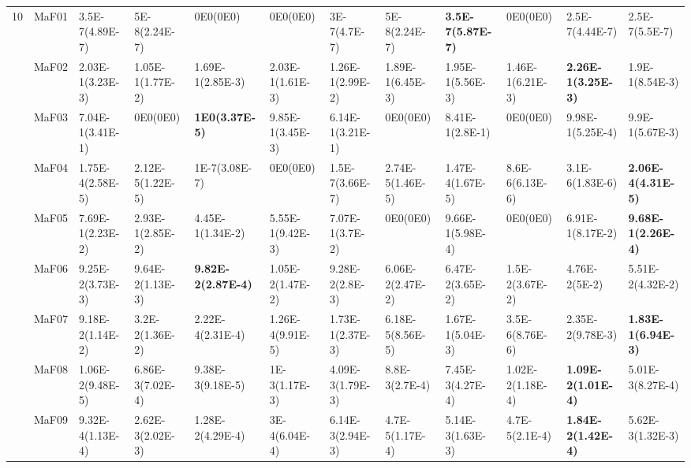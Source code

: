 \documentclass[]{article}
\begin{document}
\begin{landscape}
\begin{table}
\begin{footnotesize}
\begin{tabular}{|l|l|l|l|l|l|l|l|l|l|l|l|}
\multirow{15}{*}{10} & MaF01 & \cellcolor{gray95} 3.5E-7(4.89E-7) & \cellcolor{gray95} 5E-8(2.24E-7) & \cellcolor{gray95} 0E0(0E0) & \cellcolor{gray95} 0E0(0E0) & \cellcolor{gray95} 3E-7(4.7E-7) & \cellcolor{gray95} 5E-8(2.24E-7) & \cellcolor{gray95} {\bf 3.5E-7(5.87E-7)} & \cellcolor{gray95} 0E0(0E0) & \cellcolor{gray95} 2.5E-7(4.44E-7) & \cellcolor{gray95} 2.5E-7(5.5E-7)\\
 & MaF02 & \cellcolor{gray95} 2.03E-1(3.23E-3) & 1.05E-1(1.77E-2) & 1.69E-1(2.85E-3) & \cellcolor{gray95} 2.03E-1(1.61E-3) & 1.26E-1(2.99E-2) & 1.89E-1(6.45E-3) & 1.95E-1(5.56E-3) & 1.46E-1(6.21E-3) & \cellcolor{gray95} {\bf 2.26E-1(3.25E-3)} & 1.9E-1(8.54E-3)\\
 & MaF03 & 7.04E-1(3.41E-1) & 0E0(0E0) & \cellcolor{gray95} {\bf 1E0(3.37E-5)} & 9.85E-1(3.45E-3) & 6.14E-1(3.21E-1) & 0E0(0E0) & 8.41E-1(2.8E-1) & 0E0(0E0) & \cellcolor{gray95} 9.98E-1(5.25E-4) & \cellcolor{gray95} 9.9E-1(5.67E-3)\\
 & MaF04 & \cellcolor{gray95} 1.75E-4(2.58E-5) & 2.12E-5(1.22E-5) & 1E-7(3.08E-7) & 0E0(0E0) & 1.5E-7(3.66E-7) & 2.74E-5(1.46E-5) & \cellcolor{gray95} 1.47E-4(1.67E-5) & 8.6E-6(6.13E-6) & 3.1E-6(1.83E-6) & \cellcolor{gray95} {\bf 2.06E-4(4.31E-5)}\\
 & MaF05 & \cellcolor{gray95} 7.69E-1(2.23E-2) & 2.93E-1(2.85E-2) & 4.45E-1(1.34E-2) & 5.55E-1(9.42E-3) & 7.07E-1(3.7E-2) & 0E0(0E0) & \cellcolor{gray95} 9.66E-1(5.98E-4) & 0E0(0E0) & 6.91E-1(8.17E-2) & \cellcolor{gray95} {\bf 9.68E-1(2.26E-4)}\\
 & MaF06 & \cellcolor{gray95} 9.25E-2(3.73E-3) & \cellcolor{gray95} 9.64E-2(1.13E-3) & \cellcolor{gray95} {\bf 9.82E-2(2.87E-4)} & 1.05E-2(1.47E-2) & \cellcolor{gray95} 9.28E-2(2.8E-3) & 6.06E-2(2.47E-2) & 6.47E-2(3.65E-2) & 1.5E-2(3.67E-2) & 4.76E-2(5E-2) & 5.51E-2(4.32E-2)\\
 & MaF07 & \cellcolor{gray95} 9.18E-2(1.14E-2) & 3.2E-2(1.36E-2) & 2.22E-4(2.31E-4) & 1.26E-4(9.91E-5) & \cellcolor{gray95} 1.73E-1(2.37E-3) & 6.18E-5(8.56E-5) & \cellcolor{gray95} 1.67E-1(5.04E-3) & 3.5E-6(8.76E-6) & 2.35E-2(9.78E-3) & \cellcolor{gray95} {\bf 1.83E-1(6.94E-3)}\\
 & MaF08 & \cellcolor{gray95} 1.06E-2(9.48E-5) & 6.86E-3(7.02E-4) & 9.38E-3(9.18E-5) & 1E-3(1.17E-3) & 4.09E-3(1.79E-3) & 8.8E-3(2.7E-4) & 7.45E-3(4.27E-4) & \cellcolor{gray95} 1.02E-2(1.18E-4) & \cellcolor{gray95} {\bf 1.09E-2(1.01E-4)} & 5.01E-3(8.27E-4)\\
 & MaF09 & 9.32E-4(1.13E-4) & 2.62E-3(2.02E-3) & \cellcolor{gray95} 1.28E-2(4.29E-4) & 3E-4(6.04E-4) & 6.14E-3(2.94E-3) & 4.7E-5(1.17E-4) & 5.14E-3(1.63E-3) & 4.7E-5(2.1E-4) & \cellcolor{gray95} {\bf 1.84E-2(1.42E-4)} & 5.62E-3(1.32E-3)\\

\end{tabular}
\end{footnotesize}
\end{table}
\end{landscape}
\end{document}
